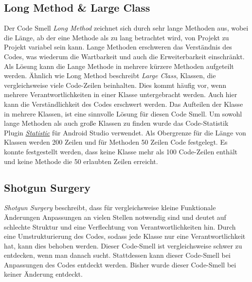 \documentclass[12pt]{article}
\begin{document}
\subsection{Long Method \& Large Class}

Der Code Smell \textit{Long Method} zeichnet sich durch sehr lange Methoden aus, wobei die Länge, ab der eine Methode als zu lang betrachtet wird, von Projekt zu Projekt variabel sein kann.
Lange Methoden erschweren das Verständnis des Codes, was wiederum die Wartbarkeit und auch die Erweiterbarkeit einschränkt. 
Als Lösung kann die Lange Methode in mehrere kürzere Methoden aufgeteilt werden.
\newline
\newline
Ähnlich wie Long Method beschreibt \textit{Large Class}, Klassen, die vergleichsweise viele Code-Zeilen beinhalten.
Dies kommt häufig vor, wenn mehrere Verantwortlichkeiten in einer Klasse untergebracht werden. Auch hier kann die Verständlichkeit des Codes erschwert werden.
Das Aufteilen der Klasse in mehrere Klassen, ist eine sinnvolle Lösung für diesen Code Smell.
\newline
\newline
Um sowohl lange Methoden als auch große Klassen zu finden wurde das Code-Statistik Plugin \href{https://plugins.jetbrains.com/plugin/4509-statistic}{\textit{Statistic}} für Android Studio verwendet.
Als Obergrenze für die Länge von Klassen werden 200 Zeilen und für Methoden 50 Zeilen Code festgelegt. Es konnte festgestellt werden, dass keine Klasse mehr als 100 Code-Zeilen enthält und keine Methode die 50 erlaubten Zeilen erreicht.

\subsection{Shotgun Surgery}

\textit{Shotgun Surgery} beschreibt, dass für vergleichsweise kleine Funktionale Änderungen Anpassungen an vielen Stellen notwendig sind und deutet auf schlechte Struktur und eine Verflechtung von Verantwortlichkeiten hin.
Durch eine Umstrukturierung des Codes, sodass jede Klasse nur eine Verantwortlichkeit hat, kann dies behoben werden.
\newline
\newline
Dieser Code-Smell ist vergleichsweise schwer zu entdecken, wenn man danach sucht. Stattdessen kann dieser Code-Smell bei Anpassungen des Codes entdeckt werden.
Bisher wurde dieser Code-Smell bei keiner Änderung entdeckt.
\end{document}

